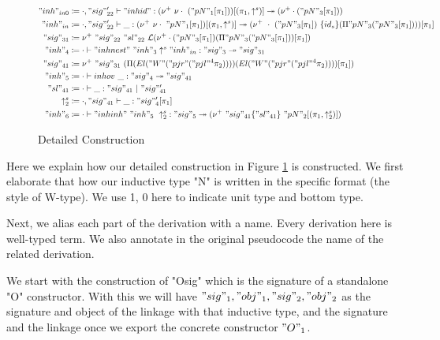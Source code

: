 \begin{figure}
  \begin{minipage}{0.8\linewidth}
    \centering
    \begin{align*}
      "inh"_{in0} &\coloneqq \goodInh{\cdot, "sig"_{22}'}{"inhid"}{(\nu^+ \ \nu\cdot \ ("pN"_1[\pi_1]))[(\pi_1, \uparrow^s)]}{(\nu^+ \cdot ("pN"_3[\pi_1]))} \\
      "inh"_{in} &\coloneqq \goodInh{\cdot , "sig"_{22}'}{\_}{(\nu^+ \ \nu\cdot \ "pN"_1[\pi_1])[(\pi_1, \uparrow^s)]}{(\nu^+ \ \cdot \ ("pN"_3[\pi_1]) \ \{id_s\} (\Pi "pN"_3 ("pN"_3[\pi_1])) )[\pi_1]}\\
      "sig"_{31} &\coloneqq  \nu^+ \ "sig"_{22} \ {"sl"_{22}}\  \cL(\nu^+ \cdot ("pN"_3[\pi_1])  (\Pi "pN"_3 ("pN"_3[\pi_1]))[\pi_1]) \\ 
      "inh"_4 &\coloneqq \goodInh{\cdot}{"inhnest" \ "inh"_3 \uparrow^s "inh"_{in}}{"sig"_3}{"sig"_{31}} \\
      "sig"_{41} &\coloneqq {\nu^+ \ "sig"_{31} \ (\Pi (El ("W" ("pjr" ("pjl"^4 \pi_2)))) (El ("W" ("pjr" ("pjl"^4 \pi_2))))[\pi_1])} \\ 
      "inh"_5 &\coloneqq \goodInh{\cdot}{inhov \ \_}{"sig"_4}{"sig"_{41}} \\ 
      "sl"_{41} &\coloneqq \goodSeal{\cdot}{\_}{"sig"_{41}}{"sig"_{41}'} \\ 
      \uparrow^s_2 &\coloneqq \goodTerm{\cdot, "sig"_{41}}{\_}{"sig"_4'[\pi_1]} \\ 
      "inh"_6 &\coloneqq \goodInh{\cdot}{"inhinh" \ "inh"_5 \ \uparrow^s_2}{"sig"_5}{(\nu^+ \ "sig"_{41} \{"sl"_{41}\} \ "pN"_2[(\pi_1, \uparrow^s_2)])}
    \end{align*}  
  \end{minipage}
  \caption{Detailed Construction}\label{fig:example-construction}
\end{figure}





Here we explain how  our detailed construction in Figure
\cref{fig:example-construction} is constructed. We first elaborate that
how our inductive type "N" is written in the specific format (the style
of W-type). We use 1, 0 here to indicate unit type and bottom type. 

Next, we alias each part of the derivation with a name. Every derivation
here is well-typed term. We also annotate in the original pseudocode the
name of the related derivation. 

We start with the construction of "Osig" which is the signature of a
standalone "O" constructor. With this we will have $"sig"_1, "obj"_1,
"sig"_2, "obj"_2$ as the signature and object of the linkage with that
inductive type, and the signature and the linkage once we export the
concrete constructor $"O"_1$. 

